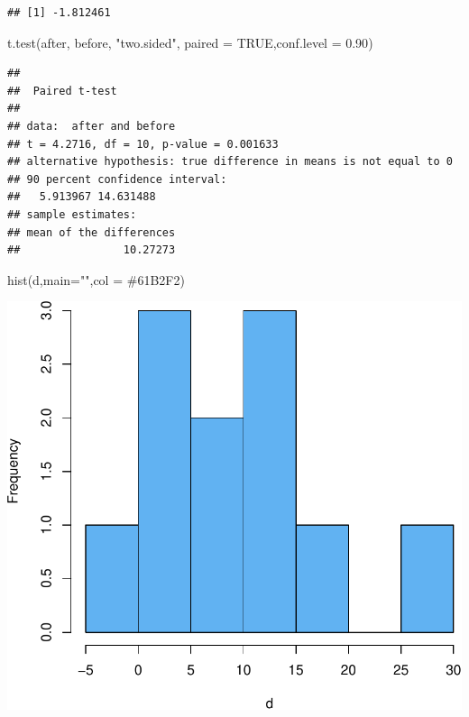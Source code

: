 \documentclass[
]{article}
\newcommand{\AttributeTok}[1]{\textcolor[rgb]{0.77,0.63,0.00}{#1}}
\newcommand{\ConstantTok}[1]{\textcolor[rgb]{0.00,0.00,0.00}{#1}}
\newcommand{\FloatTok}[1]{\textcolor[rgb]{0.00,0.00,0.81}{#1}}
\newcommand{\FunctionTok}[1]{\textcolor[rgb]{0.00,0.00,0.00}{#1}}
\newcommand{\NormalTok}[1]{#1}
\newcommand{\StringTok}[1]{\textcolor[rgb]{0.31,0.60,0.02}{#1}}
\begin{document}
\begin{verbatim}
## [1] -1.812461
\end{verbatim}

\begin{Highlighting}[]
\FunctionTok{t.test}\NormalTok{(after, before, }\StringTok{"two.sided"}\NormalTok{, }\AttributeTok{paired =} \ConstantTok{TRUE}\NormalTok{,}\AttributeTok{conf.level =} \FloatTok{0.90}\NormalTok{)}
\end{Highlighting}

\begin{verbatim}
## 
##  Paired t-test
## 
## data:  after and before
## t = 4.2716, df = 10, p-value = 0.001633
## alternative hypothesis: true difference in means is not equal to 0
## 90 percent confidence interval:
##   5.913967 14.631488
## sample estimates:
## mean of the differences 
##                10.27273
\end{verbatim}

\begin{Highlighting}[]
\FunctionTok{hist}\NormalTok{(d,}\AttributeTok{main=}\StringTok{""}\NormalTok{,}\AttributeTok{col =} \StringTok{\textquotesingle{}\#61B2F2\textquotesingle{}}\NormalTok{)}
\end{Highlighting}

\begin{center}\includegraphics[width=1\linewidth,height=1\textheight]{unnamed-chunk-59-1} \end{center}
\end{document}
